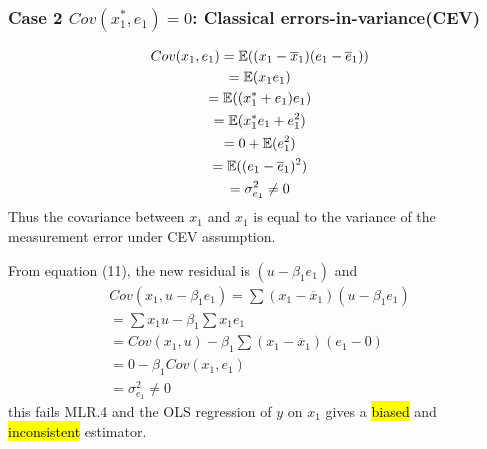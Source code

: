 \documentclass[]{article}
\begin{document}
			\subsubsection{Case 2 $Cov(x_1^{*}, e_1) = 0$: Classical errors-in-variance(CEV)}
				\begin{remark}
					\begin{gather*}
						Cov(x_1, e_1) = \mathbb{E}({(x_1 - \overline{x}_1)(e_1 - \overline{e}_1)}) \\
						= \mathbb{E}({x_1 e_1}) \\
						= \mathbb{E}({(x_1^{*} + e_1) e_1}) \\
						= \mathbb{E}({x_1^{*}e_1 + e_1^2}) \\
						= 0 + \mathbb{E}({e_1^2}) \\
						= \mathbb{E}({(e_1 - \overline{e}_1)^2}) \\
						= \sigma_{e_1}^2 \neq 0
					\end{gather*}
				Thus the covariance between $x_1$ and $x_1$ is equal to the variance of the measurement error under CEV assumption.
				\end{remark}
				
				\begin{remark}
					From equation (11), the new residual is $(u - \beta_1 e_1)$ and
					\begin{gather*}
						Cov(x_1, u - \beta_1 e_1) = \sum{(x_1 - \overline{x}_1) (u - \beta_1 e_1)} \\
						= \sum {x_1 u} - \beta_1 \sum {x_1 e_1} \\
						= Cov(x_1, u) - \beta_1 \sum {(x_1 - \overline{x}_1)(e_1 - 0)} \\
						= 0 - \beta_1 Cov(x_1, e_1) \\
						= \sigma_{e_1}^2 \neq 0
					\end{gather*}
					this fails MLR.4 and the OLS regression of $y$ on $x_1$ gives a \hl{biased} and \hl{inconsistent} estimator.
				\end{remark}
\end{document}
